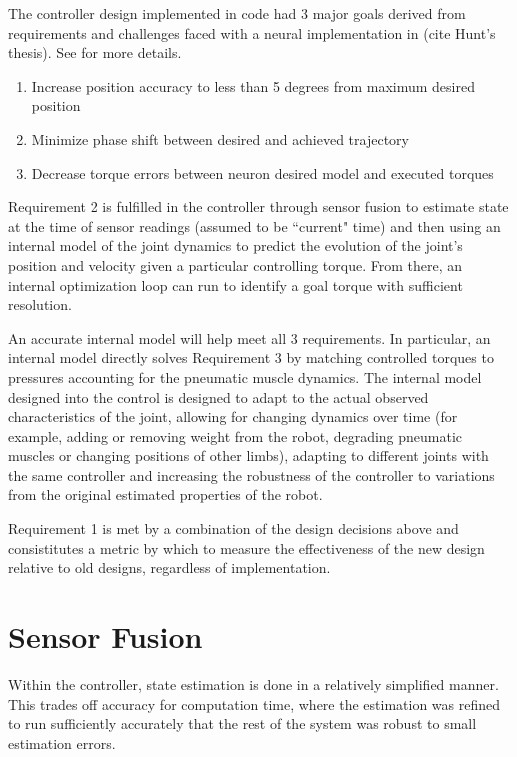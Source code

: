 The controller design implemented in code had 3 major goals derived from
requirements and challenges faced with a neural implementation in (cite Hunt's
thesis). See  for more details.

\begin{enumerate}
\item Increase position accuracy to less than 5 degrees from maximum desired
position
\item Minimize phase shift between desired and achieved trajectory
\item Decrease torque errors between neuron desired model and executed torques
\end{enumerate}

Requirement 2 is fulfilled in
the controller through sensor fusion to estimate state at the time of sensor
readings (assumed to be ``current" time) and then using an internal model of the
joint dynamics to predict the evolution of the joint's position and velocity
given a particular controlling torque. From there, an internal optimization loop
can run to identify a goal torque with sufficient resolution.

An accurate internal model will help meet all 3 requirements. In particular, an
internal model directly solves Requirement 3 by matching controlled torques to
pressures accounting for the pneumatic muscle dynamics. The internal model
designed into the control is designed to adapt to the actual observed
characteristics of the joint, allowing for changing dynamics over time (for
example, adding or removing weight from the robot, degrading pneumatic muscles
or changing positions of other limbs),
adapting to different joints with the same controller and increasing the
robustness of the controller to variations from the original estimated
properties of the robot.

Requirement 1 is met by a combination of the design decisions above and
consistitutes a metric by which to measure the effectiveness of the new design
relative to old designs, regardless of implementation.

\section{Sensor Fusion}

Within the controller, state estimation is done in a relatively simplified
manner. This trades off accuracy for computation time, where the estimation was
refined to run sufficiently accurately that the rest of the system was robust to
small estimation errors.

